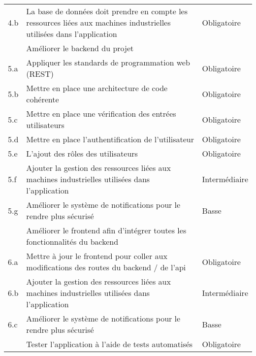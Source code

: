 \documentclass[
    iai, %
    il, %
]{heig-tb}
\begin{document}
\begin{table}[h]
\begin{center}
\begin{tabularx}{1.0\textwidth} {
                | >{\centering\arraybackslash}X
                | >{\centering\arraybackslash}X
                | >{\centering\arraybackslash}X |}
            4.b & La base de données doit prendre en compte les ressources liées aux machines industrielles utilisées dans l'application & Obligatoire   \\
            5   & Améliorer le backend du projet                                                                                         &               \\
            5.a & Appliquer les standards de programmation web (REST)                                                                    & Obligatoire   \\
            5.b & Mettre en place une architecture de code cohérente                                                                     & Obligatoire   \\
            5.c & Mettre en place une vérification des entrées utilisateurs                                                              & Obligatoire   \\
            5.d & Mettre en place l'authentification de l'utilisateur                                                                    & Obligatoire   \\
            5.e & L'ajout des rôles des utilisateurs                                                                                     & Obligatoire   \\
            5.f & Ajouter la gestion des ressources liées aux machines industrielles utilisées dans l'application                        & Intermédiaire \\
            5.g & Améliorer le système de notifications pour le rendre plus sécurisé                                                     & Basse         \\
            6   & Améliorer le frontend afin d'intégrer toutes les fonctionnalités du backend                                            &               \\
            6.a & Mettre à jour le frontend pour coller aux modifications des routes du backend / de l'api                               & Obligatoire   \\
            6.b & Ajouter la gestion des ressources liées aux machines industrielles utilisées dans l'application                        & Intermédiaire \\
            6.c & Améliorer le système de notifications pour le rendre plus sécurisé                                                     & Basse         \\
            7   & Tester l'application à l'aide de tests automatisés                                                                     & Obligatoire   \\

\end{tabularx}
\end{center}
\end{table}
\end{document}
